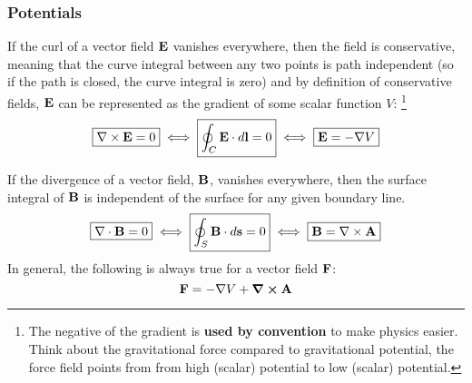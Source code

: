     \subsubsection*{Potentials}
        If the curl of a vector field $\vb{E}$ vanishes everywhere, then the field is conservative, meaning that the curve integral between any two points is path independent (so if the path is closed, the curve integral is zero) and by definition of conservative fields, $\vb{E}$ can be represented as the gradient of some scalar function $V$:
        \footnote{The negative of the gradient is \textbf{used by convention} to make physics easier. Think about the gravitational force compared to gravitational potential, the force field points from from high (scalar) potential to low (scalar) potential.}
        \begin{align*}
            \boxed{\nabla \times \vb{E} = 0} 
            \iff
            \boxed{\oint_C \vb{E}\cdot d\vb{l}=0} 
            \iff
            \boxed{\vb{E} = -\nabla V}
        \end{align*}

        If the divergence of a vector field, $\vb{B}$, vanishes everywhere, then the surface integral of $\vb{B}$ is independent of the surface for any given boundary line. 
        \begin{align*}
            \boxed{\nabla \cdot \vb{B} = 0} 
            \iff
            \boxed{\oint_S\vb{B}\cdot d\vb{s}=0}
            \iff
            \boxed{\vb{B} = \nabla \times \vb{A}}
        \end{align*}
        In general, the following is always true for a vector field $\vb{F}$:
        \begin{equation}
            \vb{F}=-\nabla V+\curl\vb{A}
        \end{equation}
%